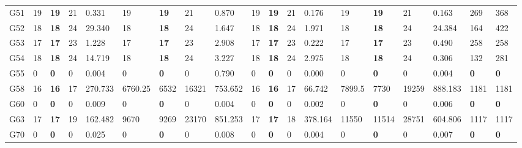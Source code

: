 \documentclass[12pt, a4paper]{article}%
\numberwithin{equation}{section}
\theoremstyle{plain}
\begin{document}
{\begin{landscape}
\begin{longtable}{lllllllllllllllllll}
						G51                       & 19   & \textbf{19}  & 21  & 0.331   & 19      & \textbf{19}  & 21    & 0.870   & 19   & \textbf{19}  & 21  & 0.176   & 19     & \textbf{19}  & 21    & 0.163   & 269                     & 368                  \\
						G52                       & 18   & \textbf{18}  & 24  & 29.340  & 18      & \textbf{18}  & 24    & 1.647   & 18   & \textbf{18}  & 24  & 1.971   & 18     & \textbf{18}  & 24    & 24.384  & 164                     & 422                  \\
						G53                       & 17   & \textbf{17}  & 23  & 1.228   & 17      & \textbf{17}  & 23    & 2.908   & 17   & \textbf{17}  & 23  & 0.222   & 17     & \textbf{17}  & 23    & 0.490   & 258                     & 258                  \\
						G54                       & 18   & \textbf{18}  & 24  & 14.719  & 18      & \textbf{18}  & 24    & 3.227   & 18   & \textbf{18}  & 24  & 2.975   & 18     & \textbf{18}  & 24    & 0.306   & 132                     & 281                  \\
						G55                       & 0    & \textbf{0}   & 0   & 0.004   & 0       & \textbf{0}   & 0     & 0.790   & 0    & \textbf{0}   & 0   & 0.000   & 0      & \textbf{0}   & 0     & 0.004   & \textbf{0}              & \textbf{0}           \\
						G58                       & 16   & \textbf{16}  & 17  & 270.733 & 6760.25 & 6532         & 16321 & 753.652 & 16   & \textbf{16}  & 17  & 66.742  & 7899.5 & 7730         & 19259 & 888.183 & 1181                    & 1181                 \\
						G60                       & 0    & \textbf{0}   & 0   & 0.009   & 0       & \textbf{0}   & 0     & 0.004   & 0    & \textbf{0}   & 0   & 0.002   & 0      & \textbf{0}   & 0     & 0.006   & \textbf{0}              & \textbf{0}           \\
						G63                       & 17   & \textbf{17}  & 19  & 162.482 & 9670    & 9269         & 23170 & 851.253 & 17   & \textbf{17}  & 18  & 378.164 & 11550  & 11514        & 28751 & 604.806 & 1117                    & 1117                 \\
						G70                       & 0    & \textbf{0}   & 0   & 0.025   & 0       & \textbf{0}   & 0     & 0.008   & 0    & \textbf{0}   & 0   & 0.004   & 0      & \textbf{0}   & 0     & 0.007   & \textbf{0}              & \textbf{0}           \\ \hline
					\end{longtable}
				\end{landscape}
			}
			
\end{document}

